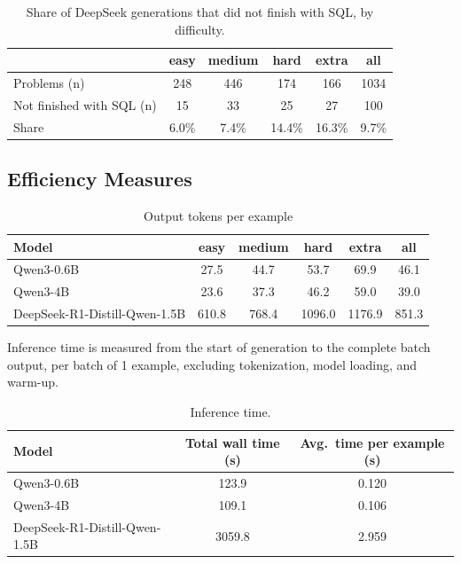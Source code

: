 \begin{table}[H]
\centering
\footnotesize
\caption{Share of DeepSeek generations that did not finish with SQL, by difficulty.}
\label{tab:deepseek-unfinished-by-difficulty}
\begin{tabular}{lccccc}
\toprule
 & easy & medium & hard & extra & all \\
\midrule
Problems (n) & 248 & 446 & 174 & 166 & 1034 \\
Not finished with SQL (n) & 15 & 33 & 25 & 27 & 100 \\
Share & 6.0\% & 7.4\% & 14.4\% & 16.3\% & 9.7\% \\
\bottomrule
\end{tabular}
\end{table}

\subsection{Efficiency Measures}
\label{sec:efficiency}

\begin{table}[H]
\centering
\footnotesize
\caption{Output tokens per example}
\label{tab:tokens-per-example}
\begin{tabular}{lccccc}
\toprule
Model & easy & medium & hard & extra & all \\
\midrule
Qwen3-0.6B & 27.5 & 44.7 & 53.7 & 69.9 & 46.1 \\
Qwen3-4B & 23.6 & 37.3 & 46.2 & 59.0 & 39.0 \\
DeepSeek-R1-Distill-Qwen-1.5B & 610.8 & 768.4 & 1096.0 & 1176.9 & 851.3 \\
\bottomrule
\end{tabular}
\end{table}

Inference time is measured from the start of generation to the complete batch output, per batch of 1 example, excluding tokenization, model loading, and warm-up.

\begin{table}[H]
\centering
\footnotesize
\caption{Inference time.}
\label{tab:inference-time}
\begin{tabular}{lcc}
\toprule
Model & Total wall time (s) & Avg.\ time per example (s) \\
\midrule
Qwen3-0.6B & 123.9 & 0.120 \\
Qwen3-4B & 109.1 & 0.106 \\
DeepSeek-R1-Distill-Qwen-1.5B & 3059.8 & 2.959 \\
\bottomrule
\end{tabular}
\end{table}

